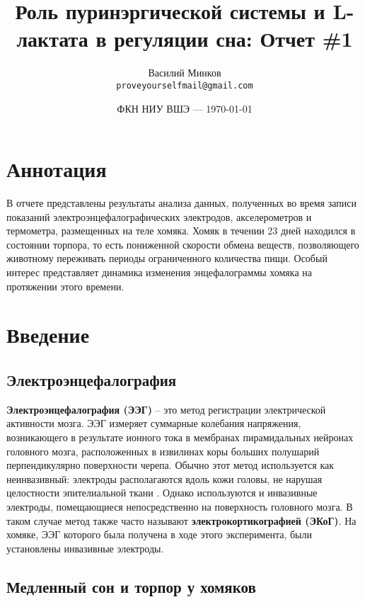 \documentclass[12pt,a4paper,oneside]{article}
\title{Роль пуринэргической системы и L-лактата в регуляции сна: Отчет \#1} %
\author{Василий Минков\\ \texttt{proveyourselfmail@gmail.com}} %
\date{ФКН НИУ ВШЭ --- \today} %
\begin{document}
\maketitle %


\tableofcontents

\section{Аннотация}

В отчете представлены результаты анализа данных, полученных во время записи показаний электроэнцефалографических электродов, акселерометров и термометра, размещенных на теле хомяка. Хомяк в течении 23 дней находился в состоянии торпора, то есть пониженной скорости обмена веществ, позволяющего животному переживать периоды ограниченного количества пищи. Особый интерес представляет динамика изменения энцефалограммы хомяка на протяжении этого времени. 

\section{Введение}

\subsection{Электроэнцефалография}

\textbf{Электроэнцефалография (ЭЭГ)} -- это метод регистрации электрической активности мозга. ЭЭГ измеряет суммарные колебания напряжения, возникающего в результате ионного тока в мембранах пирамидальных нейронах головного мозга, расположенных в извилинах коры больших полушарий перпендикулярно поверхности черепа. Обычно этот метод используется как неинвазивный: электроды располагаются вдоль кожи головы, не нарушая целостности эпителиальной ткани \cite{Luck2005}. Однако используются и инвазивные электроды, помещающиеся непосредственно на поверхность головного мозга. В таком случае метод также часто называют \textbf{электрокортикографией (ЭКоГ)}. На хомяке, ЭЭГ которого была получена в ходе этого эксперимента, были установлены инвазивные электроды.

\subsection{Медленный сон и торпор у хомяков}
\end{document}
